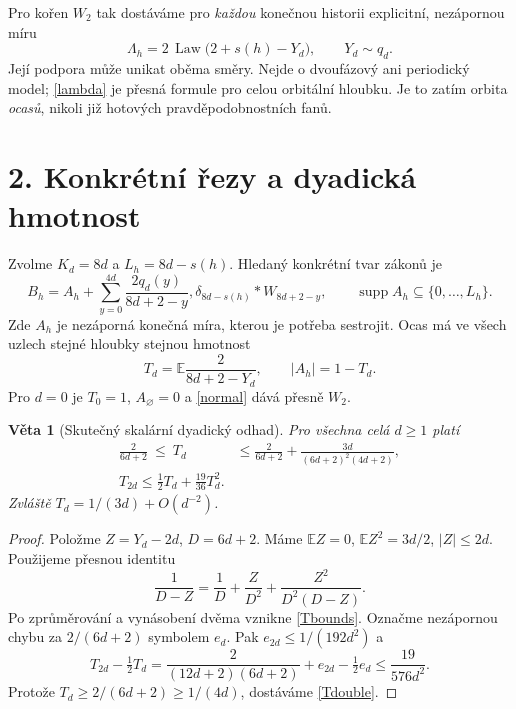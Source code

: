 \documentclass[11pt,a4paper]{article}
\newtheorem{theorem}{Věta}
\newcommand{\E}{\mathbb E}
\newcommand{\Law}{\operatorname{Law}}
\begin{document}
Pro kořen $W_2$ tak dostáváme pro \emph{každou} konečnou historii
explicitní, nezápornou míru
\begin{equation}\label{lambda}
 \boxed{\Lambda_h=2\,\Law\bigl(2+s(h)-Y_d\bigr),\qquad Y_d\sim q_d.}
\end{equation}
Její podpora může unikat oběma směry. Nejde o dvoufázový ani periodický
model; \eqref{lambda} je přesná formule pro celou orbitální hloubku.
Je to zatím orbita \emph{ocasů}, nikoli již hotových pravděpodobnostních fanů.

\section*{2. Konkrétní řezy a dyadická hmotnost}
Zvolme $K_d=8d$ a $L_h=8d-s(h)$. Hledaný konkrétní tvar zákonů je
\begin{equation}\label{normal}
 B_h=A_h+
 \sum_{y=0}^{4d}\frac{2q_d(y)}{8d+2-y},
       \delta_{8d-s(h)}*W_{8d+2-y},
 \qquad \operatorname{supp} A_h\subseteq\{0,\ldots,L_h\}.
\end{equation}
Zde $A_h$ je nezáporná konečná míra, kterou je potřeba sestrojit.
Ocas má ve všech uzlech stejné hloubky stejnou hmotnost
\begin{equation}\label{T}
 T_d=\E\frac{2}{8d+2-Y_d},\qquad |A_h|=1-T_d.
\end{equation}
Pro $d=0$ je $T_0=1$, $A_\varnothing=0$ a \eqref{normal} dává přesně $W_2$.

\begin{theorem}[Skutečný skalární dyadický odhad]\label{dyadic}
Pro všechna celá $d\ge1$ platí
\begin{align}
 \frac{2}{6d+2}\ \le\ T_d
 &\le\frac{2}{6d+2}
       +\frac{3d}{(6d+2)^2(4d+2)},\label{Tbounds}\\
 \boxed{T_{2d}\le\tfrac12T_d+\tfrac{19}{36}T_d^2.}\label{Tdouble}
\end{align}
Zvláště $T_d=1/(3d)+O(d^{-2})$.
\end{theorem}
\begin{proof}
Položme $Z=Y_d-2d$, $D=6d+2$. Máme
$\E Z=0$, $\E Z^2=3d/2$, $|Z|\le2d$. Použijeme přesnou identitu
\[
 \frac{1}{D-Z}=\frac1D+\frac{Z}{D^2}
                         +\frac{Z^2}{D^2(D-Z)}.
\]
Po zprůměrování a vynásobení dvěma vznikne \eqref{Tbounds}.
Označme nezápornou chybu za $2/(6d+2)$ symbolem $e_d$.
Pak $e_{2d}\le1/(192d^2)$ a
\[
 T_{2d}-\tfrac12T_d
 =\frac{2}{(12d+2)(6d+2)}+e_{2d}-\tfrac12e_d
 \le\frac{19}{576d^2}.
\]
Protože $T_d\ge2/(6d+2)\ge1/(4d)$, dostáváme \eqref{Tdouble}.
\end{proof}
\end{document}
